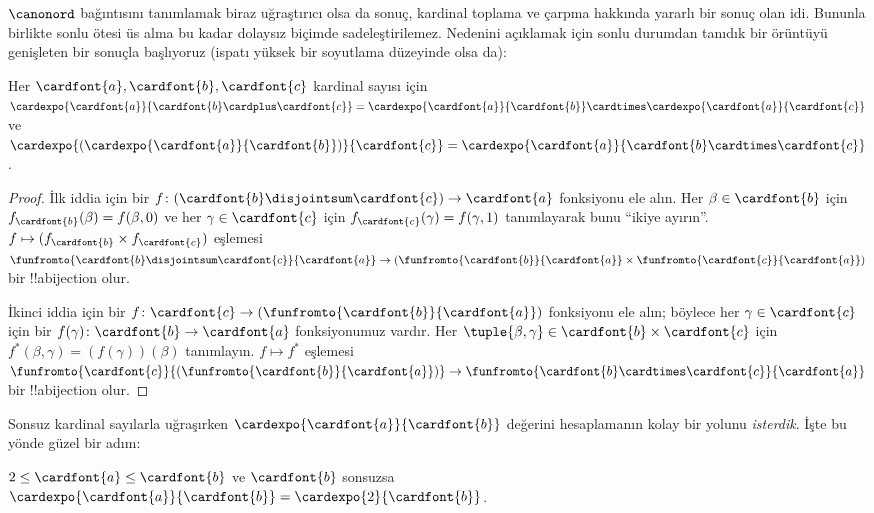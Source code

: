 \documentclass[../../../include/open-logic-section]{subfiles}
\begin{document}


$\canonord$ bağıntısını tanımlamak biraz uğraştırıcı olsa da sonuç,
kardinal toplama ve çarpma hakkında yararlı bir sonuç olan
 idi. Bununla birlikte sonlu ötesi üs alma
bu kadar dolaysız biçimde sadeleştirilemez. Nedenini açıklamak için sonlu
durumdan tanıdık bir örüntüyü genişleten bir sonuçla başlıyoruz (ispatı
yüksek bir soyutlama düzeyinde olsa da):

\begin{prop}
Her $\cardfont{a},\cardfont{b},\cardfont{c}$ kardinal sayısı için
$\cardexpo{\cardfont{a}}{\cardfont{b} \cardplus \cardfont{c}} =
\cardexpo{\cardfont{a}}{\cardfont{b}} \cardtimes
\cardexpo{\cardfont{a}}{\cardfont{c}}$ ve
$\cardexpo{(\cardexpo{\cardfont{a}}{\cardfont{b}})}{\cardfont{c}} =
\cardexpo{\cardfont{a}}{\cardfont{b} \cardtimes \cardfont{c}}$.
\end{prop}

\begin{proof}
İlk iddia için bir $f\colon
(\cardfont{b}\disjointsum\cardfont{c})\to\cardfont{a}$ fonksiyonu ele
alın. Her $\beta\in\cardfont{b}$ için
$f_\cardfont{b}(\beta)=f(\beta,0)$ ve her
$\gamma\in\cardfont{c}$ için $f_\cardfont{c}(\gamma)=f(\gamma,1)$
tanımlayarak bunu ``ikiye ayırın''. $f\mapsto
(f_\cardfont{b}\times f_\cardfont{c})$ eşlemesi
$\funfromto{\cardfont{b} \disjointsum \cardfont{c}}{\cardfont{a}} \to
(\funfromto{\cardfont{b}}{\cardfont{a}} \times
\funfromto{\cardfont{c}}{\cardfont{a}})$ bir !!a{bijection} olur.

İkinci iddia için bir $f\colon\cardfont{c}\to
(\funfromto{\cardfont{b}}{\cardfont{a}})$ fonksiyonu ele alın; böylece
her $\gamma\in\cardfont{c}$ için bir
$f(\gamma)\colon\cardfont{b}\to\cardfont{a}$ fonksiyonumuz vardır. Her
$\tuple{\beta,\gamma}\in\cardfont{b}\times\cardfont{c}$ için
$f^*(\beta,\gamma)=(f(\gamma))(\beta)$ tanımlayın. $f\mapsto f^*$
eşlemesi
$\funfromto{\cardfont{c}}{(\funfromto{\cardfont{b}}{\cardfont{a}})}
\to \funfromto{\cardfont{b} \cardtimes \cardfont{c}}{\cardfont{a}}$
bir !!a{bijection} olur.
\end{proof}

Sonsuz kardinal sayılarla uğraşırken
$\cardexpo{\cardfont{a}}{\cardfont{b}}$ değerini hesaplamanın kolay bir
yolunu \emph{isterdik}. İşte bu yönde güzel bir adım:

\begin{prop}
$2\leq\cardfont{a}\leq\cardfont{b}$ ve $\cardfont{b}$ sonsuzsa
$\cardexpo{\cardfont{a}}{\cardfont{b}} =
\cardexpo{2}{\cardfont{b}}$.
\end{prop}
\end{document}
